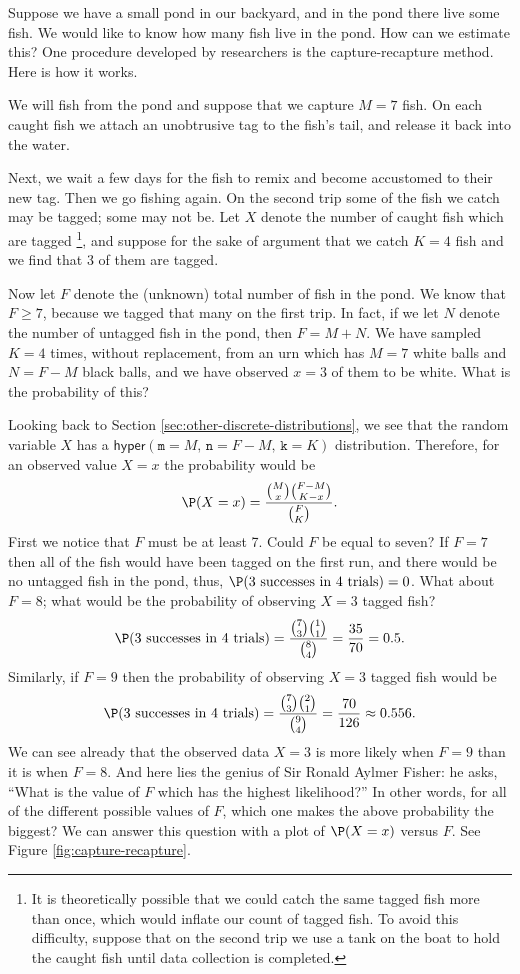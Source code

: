 \documentclass[captions=tableheading]{scrbook}
\begin{document}
\begin{example}
\label{exa:how-many-fish}
Suppose we have a small pond in our backyard, and in the pond there live some fish. We would like to know how many fish live in the pond. How can we estimate this? One procedure developed by researchers is the capture-recapture method. Here is how it works.

We will fish from the pond and suppose that we capture \(M=7\) fish. On each caught fish we attach an unobtrusive tag to the fish's tail, and release it back into the water. 

Next, we wait a few days for the fish to remix and become accustomed to their new tag. Then we go fishing again. On the second trip some of the fish we catch may be tagged; some may not be. Let \(X\) denote the number of caught fish which are tagged
\footnote{It is theoretically possible that we could catch the same tagged fish more than once, which would inflate our count of tagged fish. To avoid this difficulty, suppose that on the second trip we use a tank on the boat to hold the caught fish until data collection is completed.},
and suppose for the sake of argument that we catch \(K=4\) fish and we find that 3 of them are tagged.

Now let \(F\) denote the (unknown) total number of fish in the pond. We know that \(F\geq7\), because we tagged that many on the first trip. In fact, if we let \(N\) denote the number of untagged fish in the pond, then \(F=M+N\). We have sampled \(K=4\) times, without replacement, from an urn which has \(M=7\) white balls and \(N=F-M\) black balls, and we have observed \(x=3\) of them to be white. What is the probability of this?

Looking back to Section \ref{sec:other-discrete-distributions}, we see that the random variable \(X\) has a \(\mathsf{hyper}(\mathtt{m}=M,\,\mathtt{n}=F-M,\,\mathtt{k}=K)\) distribution. Therefore, for an observed value \(X=x\) the probability would be
\[
\P(X=x)=\frac{{M \choose x}{F-M \choose K-x}}{{F \choose K}}.
\]
First we notice that \(F\) must be at least 7. Could \(F\) be equal to seven? If \(F=7\) then all of the fish would have been tagged on the first run, and there would be no untagged fish in the pond, thus, \(\P(\mbox{3 successes in 4 trials})=0\). 
What about \(F=8\); what would be the probability of observing \(X=3\) tagged fish?
\[
\P(\mbox{3 successes in 4 trials})=\frac{{7 \choose 3}{1 \choose 1}}{{8 \choose 4}}=\frac{35}{70}=0.5.
\]
Similarly, if \(F=9\) then the probability of observing \(X=3\) tagged fish would be
\[
\P(\mbox{3 successes in 4 trials})=\frac{{7 \choose 3}{2 \choose 1}}{{9 \choose 4}}=\frac{70}{126}\approx0.556.
\]
We can see already that the observed data \(X=3\) is more likely when \(F=9\) than it is when \(F=8\). And here lies the genius of Sir Ronald Aylmer Fisher: he asks, ``What is the value of \(F\) which has the highest likelihood?'' In other words, for all of the different possible values of \(F\), which one makes the above probability the biggest? We can answer this question with a plot of \(\P(X=x)\) versus \(F\). See Figure \ref{fig:capture-recapture}.
\end{example}
\end{document}
